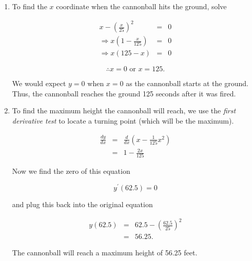 \begin{enumerate}
	\item
		To find the $x$ coordinate when the cannonball hits the ground, solve

		\begin{eqnarray*}
			x-\left(\frac{x}{25}\right)^2&=&0\\
			\Rightarrow x\left(1-\frac{x}{125}\right)&=&0\\
			\Rightarrow x\left(125-x\right)&=&0
		\end{eqnarray*}

		\[\therefore x=0\mbox{ or }x=125.\]

		We would expect $y=0$ when $x=0$ as the cannonball starts at the ground. Thus, the cannonball reaches the ground 125 seconds after it was fired.

	\item
		To find the maximum height the cannonball will reach, we use the \emph{first derivative test} to locate a turning point (which will be the maximum).

		\begin{eqnarray*}
			\frac{dy}{dx}&=&\frac{d}{dx}\left(x-\frac{1}{125}x^2\right)\\
			&=&1-\frac{2x}{125}
		\end{eqnarray*}

		Now we find the zero of this equation

		\[y^\prime\left(62.5\right)=0\]

		and plug this back into the original equation

		\begin{eqnarray*}
			y\left(62.5\right)&=&62.5-\left(\frac{62.5}{25}\right)^2\\
			&=&56.25.
		\end{eqnarray*}

		The cannonball will reach a maximum height of 56.25 feet.
\end{enumerate}
